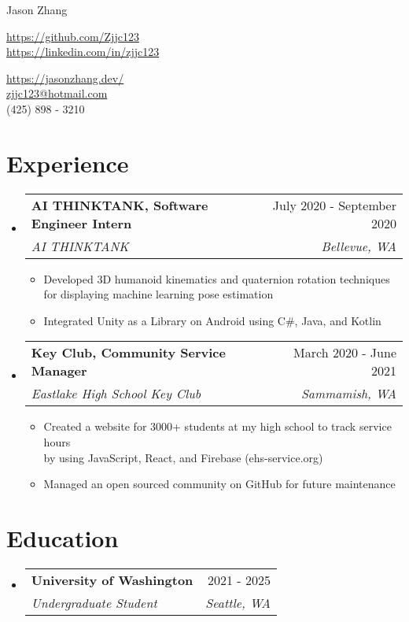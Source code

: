 \documentclass[letterpaper,10pt]{article}
\makeatletter
\newcommand{\resumeItem}[1]{
  \item\small{
    {#1 \vspace{-2pt}}
  }
}
\newcommand{\resumeSubheading}[4]{
  \vspace{-2pt}\item
    \begin{tabular*}{0.97\textwidth}[t]{l@{\extracolsep{\fill}}r}
      \textbf{#1} & #2 \\
      \textit{\small#3} & \textit{\small #4} \\
    \end{tabular*}\vspace{-7pt}
}
\newcommand{\resumeSubHeadingListStart}{\begin{itemize}[leftmargin=0.15in, label={}]}
\newcommand{\resumeSubHeadingListEnd}{\end{itemize}}
\newcommand{\resumeItemListStart}{\begin{itemize}}
\newcommand{\resumeItemListEnd}{\end{itemize}\vspace{-5pt}}
\makeatother
\begin{document}
\begin{center}
    {\large Jason Zhang} \\ \vspace{-2pt}
    \begin{multicols}{2}
    \begin{flushleft}
    \href{{your github page link}}{https://github.com/Zjjc123}\\
    \href{{your linkedin page link}}{https://linkedin.com/in/zjjc123}
    \end{flushleft}

    \begin{flushright}
    \href{{your personal websit link}}{https://jasonzhang.dev/}
    \\
    \href{mailto:{your email adress}}{zjjc123@hotmail.com}
    \\
    (425) 898 - 3210
    \end{flushright}
    \end{multicols}
\end{center}
\vspace{-15pt}
\section{Experience}
  \resumeSubHeadingListStart
    \resumeSubheading
      {AI THINKTANK, Software Engineer Intern}{July 2020 - September 2020}
      {AI THINKTANK}{Bellevue, WA}
      \resumeItemListStart
        \resumeItem{Developed 3D humanoid kinematics and quaternion rotation techniques \\ for displaying machine learning pose estimation}
        \resumeItem{Integrated Unity as a Library on Android using C\#, Java, and Kotlin}
    \resumeItemListEnd
  \resumeSubHeadingListEnd
\vspace{-5pt}
  \resumeSubHeadingListStart
    \resumeSubheading
      {Key Club, Community Service Manager}{March 2020 - June 2021}
      {Eastlake High School Key Club}{Sammamish, WA}
      \resumeItemListStart
        \resumeItem{Created a website for 3000+ students at my high school to track service hours \\ by using JavaScript, React, and Firebase (ehs-service.org)}
        \resumeItem{Managed an open sourced community on GitHub for future maintenance}
    \resumeItemListEnd
  \resumeSubHeadingListEnd
\vspace{-5pt}
\section{Education}
 \resumeSubHeadingListStart
    \resumeSubheading
      {University of Washington}{2021 - 2025}
      {Undergraduate Student}{Seattle, WA}
  \resumeSubHeadingListEnd
\end{document}
